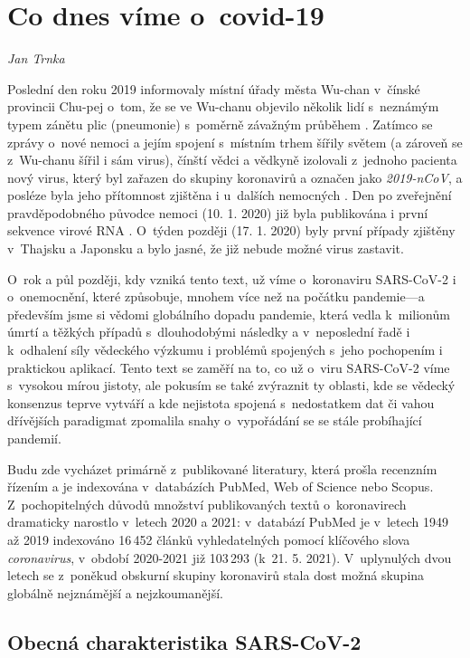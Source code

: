 \chapter{Co dnes víme o~covid-19} \label{Co_se_vi}

\textit{Jan Trnka}
\vspace{15mm}

Poslední den roku 2019 informovaly místní úřady města Wu-chan v~čínské provincii Chu-pej o~tom, že se ve Wu-chanu objevilo několik lidí s~neznámým typem zánětu plic (pneumonie) s~poměrně závažným průběhem \cite{Gralinski:2020}. Zatímco se zprávy o~nové nemoci a jejím spojení s~místním trhem šířily světem (a zároveň se z~Wu-chanu šířil i sám virus), čínští vědci a vědkyně izolovali z~jednoho pacienta nový virus, který byl zařazen do skupiny koronavirů a označen jako \textit{2019-nCoV}, a posléze byla jeho přítomnost zjištěna i u~dalších nemocných \cite{WHO:2020a}. Den po zveřejnění pravděpodobného původce nemoci (10. 1. 2020) již byla publikována i první sekvence virové RNA \cite{Zhang:2020a}. O~týden později (17. 1. 2020) byly první případy zjištěny v~Thajsku a Japonsku a bylo jasné, že již nebude možné virus zastavit.

O~rok a půl později, kdy vzniká tento text, už víme o~koronaviru SARS-CoV-2 i o~onemocnění, které způsobuje, mnohem více než na počátku pandemie---a především jsme si vědomi globálního dopadu pandemie, která vedla k~milionům úmrtí a těžkých případů s~dlouhodobými následky a v~neposlední řadě i k~odhalení síly vědeckého výzkumu i problémů spojených s~jeho pochopením i praktickou aplikací. Tento text se zaměří na to, co už o~viru SARS-CoV-2 víme s~vysokou mírou jistoty, ale pokusím se také zvýraznit ty oblasti, kde se vědecký konsenzus teprve vytváří a kde nejistota spojená s~nedostatkem dat či vahou dřívějších paradigmat zpomalila snahy o~vypořádání se se stále probíhající pandemií.

Budu zde vycházet primárně z~publikované literatury, která prošla recenzním řízením a je indexována v~databázích PubMed, Web of Science nebo Scopus. Z~pochopitelných důvodů množství publikovaných textů o~koronavirech dramaticky narostlo v~letech 2020 a 2021: v~databází PubMed je v~letech 1949 až 2019 indexováno 16\,452 článků vyhledatelných pomocí klíčového slova \textit{coronavirus}, v~období 2020-2021 již 103\,293 (k~21. 5. 2021). V~uplynulých dvou letech se z~poněkud obskurní skupiny koronavirů stala dost možná skupina globálně nejznámější a nejzkoumanější.

\section*{Obecná charakteristika SARS-CoV-2}

